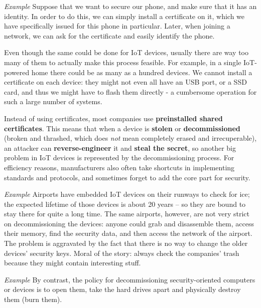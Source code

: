 \vspace{0.5em}

\emph{Example} Suppose that we want to secure our phone, and make sure that it has an identity. In order to do this, we can simply install a certificate on it, which we have specifically issued for this phone in particular. Later, when joining a network, we can ask for the certificate and easily identify the phone.

\vspace{0.5em}

Even though the same could be done for IoT devices, usually there are way too many of them to actually make this process feasible. For example, in a single IoT-powered home there could be as many as a hundred devices. We cannot install a certificate on each device: they might not even all have an USB port, or a SSD card, and thus we might have to flash them directly - a cumbersome operation for such a large number of systems.

Instead of using certificates, most companies use \textbf{preinstalled shared certificates}. This means that when a device is \textbf{stolen} or \textbf{decommissioned} (broken and thrashed, which does \textit{not} mean completely erased and irrecuperable), an attacker can \textbf{reverse-engineer} it and \textbf{steal the secret}, so another big problem in IoT devices is represented by the decommissioning process. For efficiency reasons, manufacturers also often take shortcuts in implementing standards and protocols, and sometimes forget to add the core part for security.

\vspace{0.5em}

\emph{Example} Airports have embedded IoT devices on their runways to check for ice; the expected lifetime of those devices is about 20 years – so they are bound to stay there for quite a long time. The same airports, however, are not very strict on decommissioning the devices: anyone could grab and disassemble them, access their memory, find the security data, and then access the network of the airport. The problem is aggravated by the fact that there is no way to change the older devices’ security keys. Moral of the story: always check the companies’ trash because they might contain interesting stuff.

\vspace{0.5em}

\emph{Example} By contrast, the policy for decommissioning security-oriented computers or devices is to open them, take the hard drives apart and physically destroy them (burn them).


